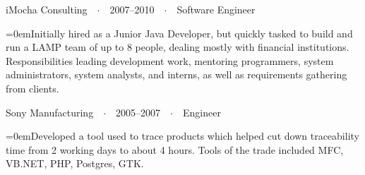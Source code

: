 \documentclass[a4paper]{scrartcl}
\newcommand{\Description}[1]{\hangindent=0em\hangafter=0\noindent\small{#1}\par\normalsize\vspace{1em}} %
\newcommand{\Redvline}[0]{\vspace{0em}\noindent{\color{ThemeColor}\rule{18cm}{0.4pt}}\vspace{-0.5em}}
\newcommand{\NewBlock}[3]{
    #1\ \ $\cdotp$\ \ #2\ \ $\cdotp$\ \ #3}
\begin{document}

\NewBlock{iMocha Consulting}{2007--2010}{Software Engineer}

\Description{Initially hired as a Junior Java Developer, but quickly tasked to build and run a LAMP team of up to 8 people, dealing mostly with financial institutions. Responsibilities leading development work, mentoring programmers, system administrators, system analysts, and interns, as well as requirements gathering from clients.
}

\NewBlock{Sony Manufacturing}{2005--2007}{Engineer}

\Description{Developed a tool used to trace products which helped cut down traceability time from 2 working days to about 4 hours. Tools of the trade included MFC, VB.NET, PHP, Postgres, GTK.}
\Redvline
\end{document}
